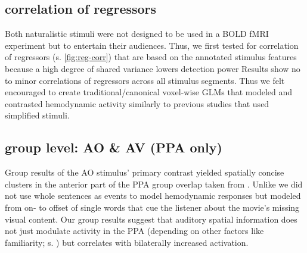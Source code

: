 \documentclass[english]{article}
\begin{document}
\subsection{correlation of regressors}

Both naturalistic stimuli were not designed to be used in a BOLD fMRI experiment
but to entertain their audiences.
Thus, we first tested for correlation of regressors (s. \ref{fig:reg-corr}) that
are based on the annotated stimulus features because a high degree of shared
variance lowers detection power
Results show no to minor correlations of regressors across all stimulus
segments.
Thus we felt encouraged to create traditional/canonical voxel-wise GLMs that
modeled and contrasted hemodynamic activity similarly to previous studies that
used simplified stimuli.







\subsection{group level: AO \& AV (PPA only)}

Group results of the AO stimulus' primary contrast yielded spatially concise
clusters in the anterior part of the PPA group overlap taken from
\citep{sengupta2016extension}.
Unlike \citep{aziz2008modulation} we did not use whole sentences as events to
model hemodynamic responses but modeled from on- to offset of single words that
cue the listener about the movie's missing visual content.
Our group results suggest that auditory spatial information does not just
modulate activity in the PPA (depending on other factors like familiarity; s.
\citep{aziz2008modulation}) but correlates with bilaterally increased
activation.
\end{document}
